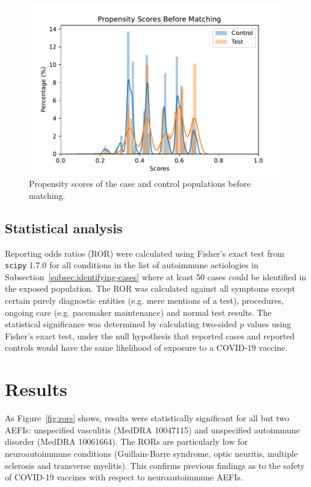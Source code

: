 \documentclass{article}
\begin{document}
\begin{figure}[H]
    \includegraphics[width=12.5 cm]{propensity_scores}
    \caption{Propensity scores of the case and control populations before matching.}
    \label{fig:propensity_scores}
\end{figure}


\subsection{Statistical analysis}

Reporting odds ratios (ROR) were calculated using Fisher's exact test from \texttt{scipy} 1.7.0 for all conditions in the list of autoimmune aetiologies in Subsection~\ref{subsec:identifying-cases} where at least 50 cases could be identified in the exposed population.
The ROR was calculated against all symptoms except certain purely diagnostic entities (e.g. mere mentions of a test), procedures, ongoing care (e.g. pacemaker maintenance) and normal test results.
The statistical significance was determined by calculating two-sided $p$ values using Fisher's exact test, under the null hypothesis that reported cases and reported controls would have the same likelihood of exposure to a COVID-19 vaccine.

\section{Results}

As Figure~\ref{fig:rors} shows, results were statistically significant for all but two AEFIs: unspecified vasculitis (MedDRA 10047115) and unspecified autoimmune disorder (MedDRA 10061664).
The RORs are particularly low for neuroautoimmune conditions (Guillain-Barre syndrome, optic neuritis, multiple sclerosis and transverse myelitis).
This confirms previous findings as to the safety of COVID-19 vaccines with respect to neuroautoimmune AEFIs.\cite{von2021vaers}
\end{document}
